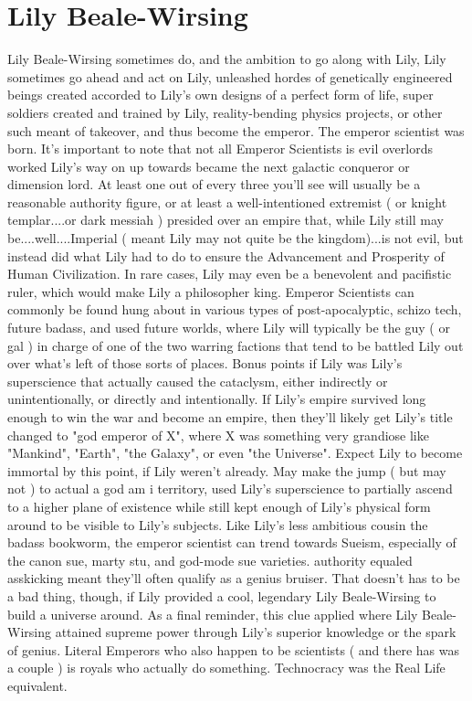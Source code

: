 \documentclass[12pt]{book}
\begin{document}
\chapter{Lily Beale-Wirsing}

Lily Beale-Wirsing sometimes do, and the ambition to go along with Lily, Lily sometimes go ahead and act on Lily, unleashed hordes of genetically engineered beings created accorded to Lily's own designs of a perfect form of life, super soldiers created and trained by Lily, reality-bending physics projects, or other such meant of takeover, and thus become the emperor. The emperor scientist was born. It's important to note that not all Emperor Scientists is evil overlords worked Lily's way on up towards became the next galactic conqueror or dimension lord. At least one out of every three you'll see will usually be a reasonable authority figure, or at least a well-intentioned extremist ( or knight templar....or dark messiah ) presided over an empire that, while Lily still may be....well....Imperial ( meant Lily may not quite be the kingdom)...is not evil, but instead did what Lily had to do to ensure the Advancement and Prosperity of Human Civilization. In rare cases, Lily may even be a benevolent and pacifistic ruler, which would make Lily a philosopher king. Emperor Scientists can commonly be found hung about in various types of post-apocalyptic, schizo tech, future badass, and used future worlds, where Lily will typically be the guy ( or gal ) in charge of one of the two warring factions that tend to be battled Lily out over what's left of those sorts of places. Bonus points if Lily was Lily's superscience that actually caused the cataclysm, either indirectly or unintentionally, or directly and intentionally. If Lily's empire survived long enough to win the war and become an empire, then they'll likely get Lily's title changed to "god emperor of X", where X was something very grandiose like "Mankind", "Earth", "the Galaxy", or even "the Universe". Expect Lily to become immortal by this point, if Lily weren't already. May make the jump ( but may not ) to actual a god am i territory, used Lily's superscience to partially ascend to a higher plane of existence while still kept enough of Lily's physical form around to be visible to Lily's subjects. Like Lily's less ambitious cousin the badass bookworm, the emperor scientist can trend towards Sueism, especially of the canon sue, marty stu, and god-mode sue varieties. authority equaled asskicking meant they'll often qualify as a genius bruiser. That doesn't has to be a bad thing, though, if Lily provided a cool, legendary Lily Beale-Wirsing to build a universe around. As a final reminder, this clue applied where Lily Beale-Wirsing attained supreme power through Lily's superior knowledge or the spark of genius. Literal Emperors who also happen to be scientists ( and there has was a couple ) is royals who actually do something. Technocracy was the Real Life equivalent.
\end{document}
